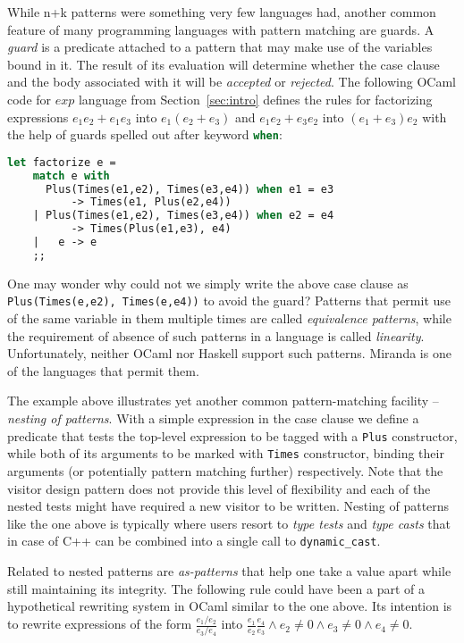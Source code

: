 \documentclass[preprint]{sigplanconf}
\DeclareRobustCommand{\code}[1]{{\lstinline[breaklines=false]{#1}}}
\DeclareRobustCommand{\codeocaml}[1]{{\lstinline[breaklines=false,language=Caml]{#1}}}
\begin{document}
While n+k patterns were something very few languages had, another common feature of 
many programming languages with pattern matching are guards. A \emph{guard} 
is a predicate attached to a pattern that may make use of the variables bound in 
it. The result of its evaluation will determine whether the case clause and the 
body associated with it will be \emph{accepted} or \emph{rejected}. The 
following OCaml code for $exp$ language from Section~\ref{sec:intro} defines the 
rules for factorizing expressions $e_1e_2+e_1e_3$ into $e_1(e_2+e_3)$ and 
$e_1e_2+e_3e_2$ into $(e_1+e_3)e_2$ with the help of guards spelled out after 
keyword \codeocaml{when}:

\begin{lstlisting}[language=Caml,keepspaces,columns=flexible]
let factorize e =
    match e with
      Plus(Times(e1,e2), Times(e3,e4)) when e1 = e3 
          -> Times(e1, Plus(e2,e4))
    | Plus(Times(e1,e2), Times(e3,e4)) when e2 = e4 
          -> Times(Plus(e1,e3), e4)
    |   e -> e
    ;;
\end{lstlisting}

One may wonder why could not we simply write the above case clause as 
\codeocaml{Plus(Times(e,e2), Times(e,e4))} to avoid the guard? Patterns that 
permit use of the same variable in them multiple times are called 
\emph{equivalence patterns}, while the requirement of absence of such patterns 
in a language is called \emph{linearity}. Unfortunately, neither OCaml nor 
Haskell support such patterns. Miranda\cite{Miranda85} is one of the languages 
that permit them. 

The example above illustrates yet another common pattern-matching facility -- 
\emph{nesting of patterns}. With a simple expression in the case clause we 
define a predicate that tests the top-level expression to be tagged with a
\codeocaml{Plus} constructor, while both of its arguments to be marked with 
\codeocaml{Times} constructor, binding their arguments (or potentially pattern 
matching further) respectively. Note that the visitor design pattern does not 
provide this level of flexibility and each of the nested tests might have 
required a new visitor to be written. Nesting of patterns like the one above is 
typically where users resort to \emph{type tests} and \emph{type casts} that in 
case of C++ can be combined into a single call to \code{dynamic_cast}.

Related to nested patterns are \emph{as-patterns} that help one take a value 
apart while still maintaining its integrity. The following rule could have been 
a part of a hypothetical rewriting system in OCaml similar to the one above. Its 
intention is to rewrite expressions of the form $\frac{e_1/e_2}{e_3/e_4}$ into 
$\frac{e_1}{e_2}\frac{e_4}{e_3} \wedge e_2\neq0 \wedge e_3\neq0 \wedge e_4\neq0$.
\end{document}
